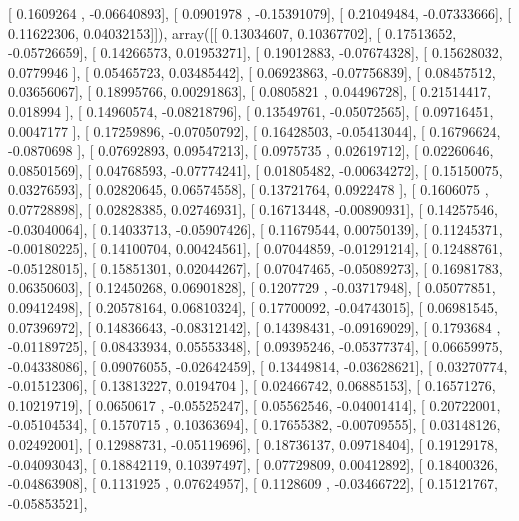 \documentclass{article}
\begin{document}
       [ 0.1609264 , -0.06640893],
       [ 0.0901978 , -0.15391079],
       [ 0.21049484, -0.07333666],
       [ 0.11622306,  0.04032153]]), array([[ 0.13034607,  0.10367702],
       [ 0.17513652, -0.05726659],
       [ 0.14266573,  0.01953271],
       [ 0.19012883, -0.07674328],
       [ 0.15628032,  0.0779946 ],
       [ 0.05465723,  0.03485442],
       [ 0.06923863, -0.07756839],
       [ 0.08457512,  0.03656067],
       [ 0.18995766,  0.00291863],
       [ 0.0805821 ,  0.04496728],
       [ 0.21514417,  0.018994  ],
       [ 0.14960574, -0.08218796],
       [ 0.13549761, -0.05072565],
       [ 0.09716451,  0.0047177 ],
       [ 0.17259896, -0.07050792],
       [ 0.16428503, -0.05413044],
       [ 0.16796624, -0.0870698 ],
       [ 0.07692893,  0.09547213],
       [ 0.0975735 ,  0.02619712],
       [ 0.02260646,  0.08501569],
       [ 0.04768593, -0.07774241],
       [ 0.01805482, -0.00634272],
       [ 0.15150075,  0.03276593],
       [ 0.02820645,  0.06574558],
       [ 0.13721764,  0.0922478 ],
       [ 0.1606075 ,  0.07728898],
       [ 0.02828385,  0.02746931],
       [ 0.16713448, -0.00890931],
       [ 0.14257546, -0.03040064],
       [ 0.14033713, -0.05907426],
       [ 0.11679544,  0.00750139],
       [ 0.11245371, -0.00180225],
       [ 0.14100704,  0.00424561],
       [ 0.07044859, -0.01291214],
       [ 0.12488761, -0.05128015],
       [ 0.15851301,  0.02044267],
       [ 0.07047465, -0.05089273],
       [ 0.16981783,  0.06350603],
       [ 0.12450268,  0.06901828],
       [ 0.1207729 , -0.03717948],
       [ 0.05077851,  0.09412498],
       [ 0.20578164,  0.06810324],
       [ 0.17700092, -0.04743015],
       [ 0.06981545,  0.07396972],
       [ 0.14836643, -0.08312142],
       [ 0.14398431, -0.09169029],
       [ 0.1793684 , -0.01189725],
       [ 0.08433934,  0.05553348],
       [ 0.09395246, -0.05377374],
       [ 0.06659975, -0.04338086],
       [ 0.09076055, -0.02642459],
       [ 0.13449814, -0.03628621],
       [ 0.03270774, -0.01512306],
       [ 0.13813227,  0.0194704 ],
       [ 0.02466742,  0.06885153],
       [ 0.16571276,  0.10219719],
       [ 0.0650617 , -0.05525247],
       [ 0.05562546, -0.04001414],
       [ 0.20722001, -0.05104534],
       [ 0.1570715 ,  0.10363694],
       [ 0.17655382, -0.00709555],
       [ 0.03148126,  0.02492001],
       [ 0.12988731, -0.05119696],
       [ 0.18736137,  0.09718404],
       [ 0.19129178, -0.04093043],
       [ 0.18842119,  0.10397497],
       [ 0.07729809,  0.00412892],
       [ 0.18400326, -0.04863908],
       [ 0.1131925 ,  0.07624957],
       [ 0.1128609 , -0.03466722],
       [ 0.15121767, -0.05853521],
\end{document}
